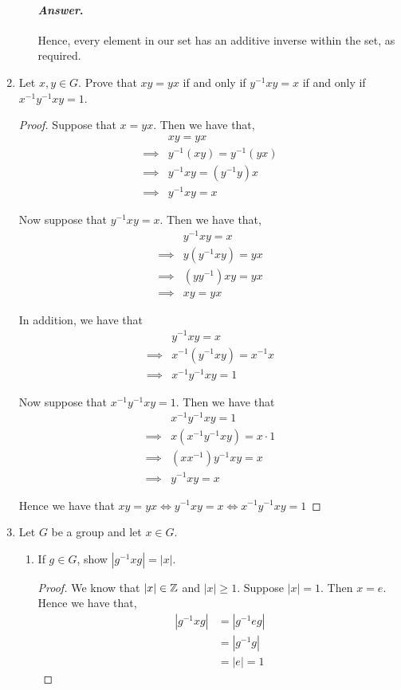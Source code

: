 \documentclass[11pt, reqno]{amsart}
\theoremstyle{plain}
\theoremstyle{definition}
\theoremstyle{example}
\newenvironment{ans}{\color{black}\medskip \paragraph*{\emph{Answer}.}}{\hfill \break  $~\!\!$ \dotfill \medskip }
\begin{document}
\begin{enumerate}[1.]
\begin{enumerate}
\begin{ans}
Hence, every element in our set has an additive inverse within the set, as required.
\end{ans}
\end{enumerate}

\item Let $x, y \in G$. Prove that $xy=yx$ if and only if $y^{-1}xy = x$ if and only if $x^{-1}y^{-1}xy=1$.



\begin{proof}
Suppose that $x = yx$. Then we have that,
\begin{align*}
&xy = yx\\
\implies &y^{-1}(xy) = y^{-1}(yx)\\
\implies &y^{-1}xy = (y^{-1}y)x\\
\implies &y^{-1}xy = x
\end{align*}

Now suppose that $y^{-1}xy = x$. Then we have that,
\begin{align*}
&y^{-1}xy = x\\
\implies &y(y^{-1}xy) = yx\\
\implies &(yy^{-1})xy = yx\\
\implies &xy = yx
\end{align*}

In addition, we have that
\begin{align*}
&y^{-1}xy = x\\
\implies &x^{-1}(y^{-1}xy) = x^{-1}x\\
\implies &x^{-1}y^{-1}xy = 1
\end{align*}

Now suppose that $x^{-1}y^{-1}xy = 1$. Then we have that
\begin{align*}
&x^{-1}y^{-1}xy = 1\\
\implies &x(x^{-1}y^{-1}xy) = x \cdot 1\\
\implies &(xx^{-1})y^{-1}xy = x\\
\implies &y^{-1}xy = x
\end{align*}

Hence we have that $xy = yx \iff y^{-1}xy = x \iff x^{-1}y^{-1}xy = 1$
\end{proof}

\item Let $G$ be a group and let $x \in G$.
\begin{enumerate}
\item If $g \in G$, show $|g^{-1}xg| = |x|$. 

\begin{proof}
We know that $|x| \in \mathbb{Z}$ and $|x| \geq 1$. Suppose $|x| = 1$. Then $x = e$. Hence we have that,
\begin{align*}
|g^{-1}xg| &= |g^{-1}eg|\\
&= |g^{-1}g|\\
&= |e| = 1
\end{align*}


\end{proof}
\end{enumerate}
\end{enumerate}
\end{document}
